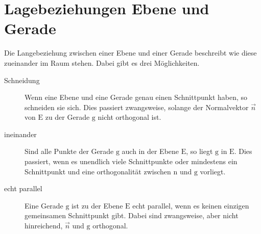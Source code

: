 \documentclass{article}
\begin{document}
 
\newcommand{\vect}[1]{\overrightarrow{#1}}
\newcommand{\drawplane}[0]{ 
 \begin{scope} 
  \clip(-0.7,0) rectangle (3.7,3);
  \fill[blue!20] (1.2-0*1.2-1.4,1-0*0.7+0.3) -- (1.2+1*1.2-1.4,1+1*0.7+0.3) -- (1.2+1*1.2+1.4,1+1*0.7-0.3) -- (1.2-0*1.2+1.4,1-0*0.7-0.3) -- cycle;
  \draw (1.5, 1.6) node[black] {$\mathrm{E}$}; 
 \end{scope}
} 
 
\newcommand{\drawuv}[0]{ 
 \draw[->,thick,blue] (0.3,1.35) -- ++(1.2*0.5,0.7*0.5) node[above left] {$\vect{u}$};
 \draw[->,thick,red] (0.3,1.35) -- ++(1.4*0.5,-0.3*0.5) node[below left] {$\vect{v}$}; 
} 
  
\section{Lagebeziehungen Ebene und Gerade}
Die Langebeziehung zwischen einer Ebene und einer Gerade beschreibt wie diese zueinander im Raum stehen. Dabei gibt es drei Möglichkeiten.
\begin{description}
 \item[Schneidung] Wenn eine Ebene und eine Gerade genau einen Schnittpunkt haben, so schneiden sie sich. Dies passiert zwangsweise, solange der Normalvektor $\vect{n}$ von $\mathrm{E}$ zu der Gerade $\mathrm{g}$ nicht orthogonal ist.
 \item[ineinander] Sind alle Punkte der Gerade $\mathrm{g}$ auch in der Ebene $\mathrm{E}$, so liegt $\mathrm{g}$ in $\mathrm{E}$. Dies passiert, wenn es unendlich viele Schnittpunkte oder mindestens ein Schnittpunkt und eine orthogonalität zwischen $\mathrm{n}$ und $\mathrm{g}$ vorliegt. 
 \item[echt parallel] Eine Gerade $\mathrm{g}$ ist zu der Ebene $\mathrm{E}$ echt parallel, wenn es keinen einzigen gemeinsamen Schnittpunkt gibt. Dabei sind zwangsweise, aber nicht hinreichend, $\vect{n}$ und $\mathrm{g}$ orthogonal.
\end{description}
 
\end{document}
